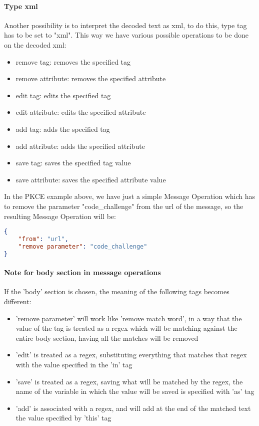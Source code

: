 \paragraph{Type xml}
Another possibility is to interpret the decoded text as xml, to do this, type tag has to be set to "xml".
This way we have various possible operations to be done on the decoded xml:
\begin{itemize}
    \item remove tag: removes the specified tag
    \item remove attribute: removes the specified attribute
    \item edit tag: edits the specified tag
    \item edit attribute: edits the specified attribute
    \item add tag: adds the specified tag
    \item add attribute: adds the specified attribute
    \item save tag: saves the specified tag value
    \item save attribute: saves the specified attribute value
\end{itemize}

In the PKCE example above, we have just a simple Message Operation which has to remove the parameter "code\_challenge" from the url of the message, so the resulting Message Operation will be:
\begin{lstlisting}[language=json, caption=Message Operation definition]
{
    "from": "url",
    "remove parameter": "code_challenge"
}
\end{lstlisting}

\paragraph{Note for body section in message operations}
If the 'body' section is chosen, the meaning of the following tags becomes different:
\begin{itemize}
    \item 'remove parameter' will work like 'remove match word', in a way that the value of the tag is treated as a regex which will be matching against the entire body section, having all the matches will be removed
    \item 'edit' is treated as a regex, substituting everything that matches that regex with the value specified in the 'in' tag
    \item 'save' is treated as a regex, saving what will be matched by the regex, the name of the variable in which the value will be saved is specified with 'as' tag
    \item 'add' is associated with a regex, and will add at the end of the matched text the value specified by 'this' tag
\end{itemize}

